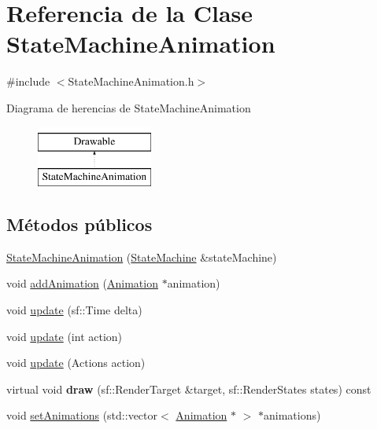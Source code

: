 \hypertarget{classStateMachineAnimation}{}\section{Referencia de la Clase State\+Machine\+Animation}
\label{classStateMachineAnimation}


{\ttfamily \#include $<$State\+Machine\+Animation.\+h$>$}

Diagrama de herencias de State\+Machine\+Animation\begin{figure}[H]
\begin{center}
\leavevmode
\includegraphics[height=2.000000cm]{classStateMachineAnimation}
\end{center}
\end{figure}
\subsection*{Métodos públicos}
\begin{DoxyCompactItemize}
\item 
\hyperlink{classStateMachineAnimation_ab3e0c7cea2112e3ae5a8093e3057a3b6}{State\+Machine\+Animation} (\hyperlink{classStateMachine}{State\+Machine} \&state\+Machine)
\item 
void \hyperlink{classStateMachineAnimation_aa2d5c955f19ec518080aa0cde7944473}{add\+Animation} (\hyperlink{classAnimation}{Animation} $\ast$animation)
\item 
void \hyperlink{classStateMachineAnimation_a8c715fbbaa26c4e52c72e074d27e2ea1}{update} (sf\+::\+Time delta)
\item 
void \hyperlink{classStateMachineAnimation_aadd7174f7f5aaa13d1a9889e5cc3539f}{update} (int action)
\item 
void \hyperlink{classStateMachineAnimation_a85f6a5c3b3963e9fd8767216ec0e735a}{update} (Actions action)
\item 
\hypertarget{classStateMachineAnimation_a717c4e5c86f7592acf43e5d4e184c002}{}virtual void {\bfseries draw} (sf\+::\+Render\+Target \&target, sf\+::\+Render\+States states) const \label{classStateMachineAnimation_a717c4e5c86f7592acf43e5d4e184c002}

\item 
void \hyperlink{classStateMachineAnimation_a4612f25e1bc04639bf7998fc6f90c23d}{set\+Animations} (std\+::vector$<$ \hyperlink{classAnimation}{Animation} $\ast$ $>$ $\ast$animations)
\end{DoxyCompactItemize}


